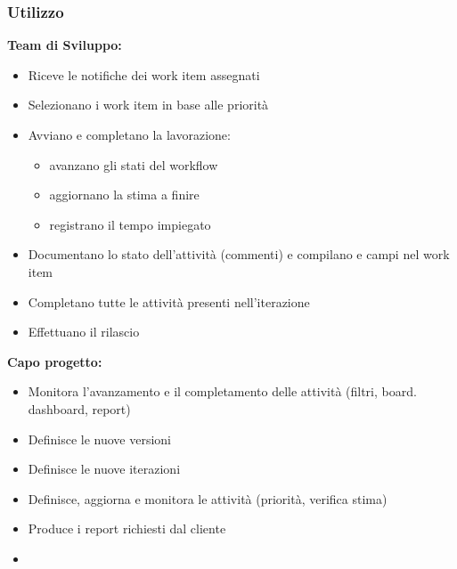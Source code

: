 \subsubsection{Utilizzo}
\begin{multicols}{2}
    \raggedright
    \textbf{Team di Sviluppo:}
    \begin{itemize}
        \item Riceve le notifiche dei work item assegnati
        \item Selezionano i work item in base alle priorità
        \item Avviano e completano la lavorazione:
        \begin{itemize}
            \item avanzano gli stati del workflow
            \item aggiornano la stima a finire
            \item registrano il tempo impiegato
        \end{itemize} 
        \item Documentano lo stato dell'attività (commenti) e compilano e campi nel work item
        \item Completano tutte le attività presenti nell'iterazione
        \item Effettuano il rilascio
    \end{itemize}
    \columnbreak
    \textbf{Capo progetto:}
    \begin{itemize}
        \item Monitora l'avanzamento e il completamento delle attività (filtri, board. dashboard, report)
        \item Definisce le nuove versioni
        \item Definisce le nuove iterazioni
        \item Definisce, aggiorna e monitora le attività (priorità, verifica stima)
        \item Produce i report richiesti dal cliente
        \item[]
    \end{itemize}
\end{multicols}

\newpage